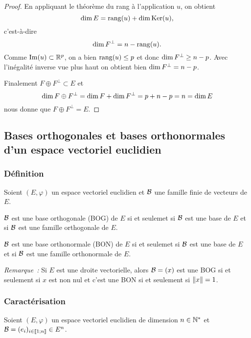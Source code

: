 \begin{proof}
  En appliquant le théorème du rang à l'application $u$, on obtient
  \begin{equation}
    \operatorname{dim} E = \operatorname{rang}(u) + \operatorname{dim} \operatorname{Ker}(u),
  \end{equation}
  c'est-à-dire
  \begin{equation}
    \operatorname{dim} F^\perp = n-\operatorname{rang}(u).
  \end{equation}
  Comme $\operatorname{Im}(u) \subset \mathbb{R}^p$, on a bien $\operatorname{rang}(u) \leq p$ et donc $\operatorname{dim} F^\perp \geq n-p$. Avec l'inégalité inverse vue plus haut on obtient bien $\operatorname{dim} F^\perp = n-p$.

  Finalement $F \oplus F^\perp \subset E$ et
  \begin{equation}
    \operatorname{dim} F \oplus F^\perp = \operatorname{dim} F + \operatorname{dim} F^\perp = p+n-p=n=\operatorname{dim} E
  \end{equation}
  nous donne que $F \oplus F^\perp = E$.
\end{proof}

\subsection{Bases orthogonales et bases orthonormales d'un espace vectoriel euclidien}

\subsubsection{Définition}

Soient $(E,\varphi)$ un espace vectoriel euclidien et $\mathcal{B}$ une famille finie de vecteurs de $E$.
\begin{defdef}
  $\mathcal{B}$ est une base orthogonale (BOG) de $E$ si et seulemet si $\mathcal{B}$ est une base de $E$ et si $\mathcal{B}$ est une famille orthogonale de $E$.

  $\mathcal{B}$ est une base orthonormale (BON) de $E$ si et seulemet si $\mathcal{B}$ est une base de $E$ et si $\mathcal{B}$ est une famille orthonormale de $E$.
\end{defdef}

\emph{Remarque~:} Si $E$ est une droite vectorielle, alors $\mathcal{B}=(x)$ est une BOG si et seulement si $x$ est non nul et c'est une BON si et seulement si $\left\lVert x\right\rVert=1$.

\subsubsection{Caractérisation}

Soient $(E,\varphi)$ un espace vectoriel euclidien de dimension $n\in \mathbb{N}^*$ et $\mathcal{B}=(e_i)_{i \in \mathopen{\llbracket}1\mathclose{}\mathpunct{};n\mathclose{\rrbracket}} \in E^n$.

